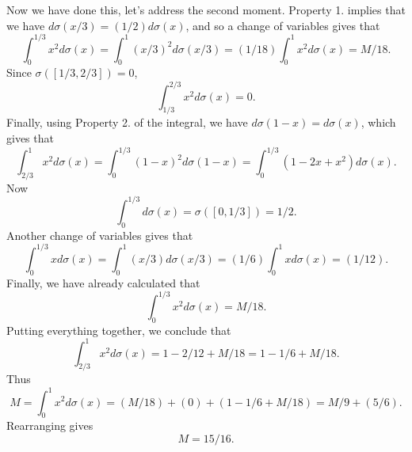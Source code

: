 \documentclass[answers]{exam}
\begin{document}
\begin{questions}
\begin{parts}
\begin{solution}
		Now we have done this, let's address the second moment. Property 1. implies that we have $d \sigma(x/3) = (1/2) d\sigma(x)$, and so a change of variables gives that
		\[ \int_0^{1/3} x^2 d\sigma(x) = \int_0^1 (x/3)^2 d\sigma(x/3) = (1/18) \int_0^1 x^2 d\sigma(x) = M/18. \]
		Since $\sigma([1/3,2/3]) = 0$,
		\[ \int_{1/3}^{2/3} x^2 d\sigma(x) = 0. \]
		Finally, using Property 2. of the integral, we have $d \sigma(1 - x) = d \sigma(x)$, which gives that
		\[ \int_{2/3}^1 x^2 d\sigma(x) = \int_0^{1/3} (1 - x)^2 d \sigma(1 - x) = \int_0^{1/3} (1 - 2x + x^2) d \sigma(x). \]
		Now
		\[ \int_0^{1/3} d\sigma(x) = \sigma([0,1/3]) = 1/2. \]
		Another change of variables gives that
		\[ \int_0^{1/3} x d\sigma(x) = \int_0^1 (x/3) d\sigma(x/3) = (1/6) \int_0^1 x d\sigma(x) = (1/12). \]
		Finally, we have already calculated that
		\[ \int_0^{1/3} x^2 d\sigma(x) = M/18. \]
		Putting everything together, we conclude that
		\[ \int_{2/3}^1 x^2 d\sigma(x) = 1 - 2/12 + M/18 = 1 - 1/6 + M/18. \]
		Thus
		\[ M = \int_0^1 x^2 d\sigma(x) = (M/18) + (0) + (1 - 1/6 + M/18) = M/9 + (5/6). \]
		Rearranging gives
		\[ M = 15/16. \]
	\end{solution}
\end{parts}


\end{questions}
\end{document}

